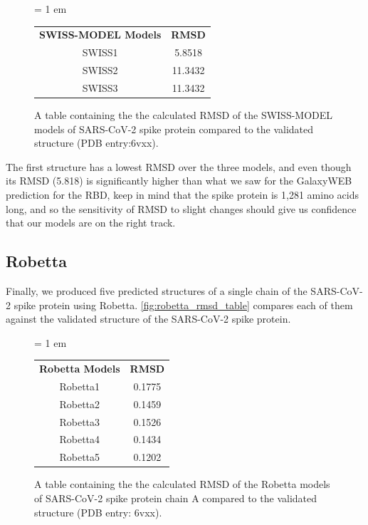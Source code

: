 \begin{figure}[h]
	\centering
	\tabcolsep = 1 em
	\mySfFamily
	\begin{tabular}{c c}
		\textbf{SWISS-MODEL Models} & \textbf{RMSD} \\
		SWISS1 & 5.8518 \\
		SWISS2 & 11.3432 \\
		SWISS3 & 11.3432 \\
	\end{tabular}
	\caption{A table containing the the calculated RMSD of the SWISS-MODEL models of SARS-CoV-2 spike protein compared to the validated structure (PDB entry:6vxx).}
	\label{fig:swiss_rmsd_table}
\end{figure}

The first structure has a lowest RMSD over the three models, and even though its RMSD (5.818) is significantly higher than what we saw for the GalaxyWEB prediction for the RBD, keep in mind that the spike protein is 1,281 amino acids long, and so the sensitivity of RMSD to slight changes should give us confidence that our models are on the right track.

\FloatBarrier
{}
\subsection{Robetta}

Finally, we produced five predicted structures of a single chain of the SARS-CoV-2 spike protein using Robetta. \autoref{fig:robetta_rmsd_table} compares each of them against the validated structure of the SARS-CoV-2 spike protein.\\

\begin{figure}[h]
	\centering
	\tabcolsep = 1 em
	\mySfFamily
	\begin{tabular}{c c}
		\textbf{Robetta Models} & \textbf{RMSD} \\
		Robetta1 & 0.1775 \\
		Robetta2 & 0.1459 \\
		Robetta3 & 0.1526 \\
		Robetta4 & 0.1434 \\
		Robetta5 & 0.1202 \\
	\end{tabular}
	\caption{A table containing the the calculated RMSD of the Robetta models of SARS-CoV-2 spike protein chain A compared to the validated structure (PDB entry: 6vxx).}
	\label{fig:robetta_rmsd_table}
\end{figure}

